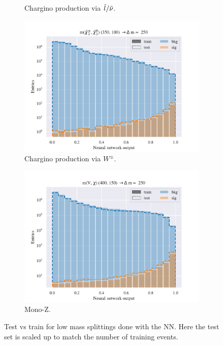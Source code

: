 \begin{figure}[H]
\begin{subfigure}[t!]{0.49\textwidth}
        \caption{Chargino production via $\Tilde{l}/\Tilde{\nu}$.}
        \label{fig:SlepsnuNNLow}
    \end{subfigure}    
    \begin{subfigure}[t!]{0.49\textwidth}
        \includegraphics[width = \textwidth]{Figures/WW/NN/Low_level/Inter/scaled_train_test_395320.pdf}
        \caption{Chargino production via $W^\pm$.}
        \label{fig:WWNNLow}
    \end{subfigure}
    \begin{subfigure}[t!]{0.49\textwidth}
        \includegraphics[width = \textwidth]{Figures/Mono_Z/ML/NN/Low_level/Inter/scaled_train_test_310613.pdf}
        \caption{Mono-Z.}
        \label{fig:MonoZNNLow}
    \end{subfigure}
    \caption{Test vs train for low mass splittings done with the NN. Here the test set is scaled up to match the number of training events.}
    \label{fig:AllLowNN}
\end{figure}



